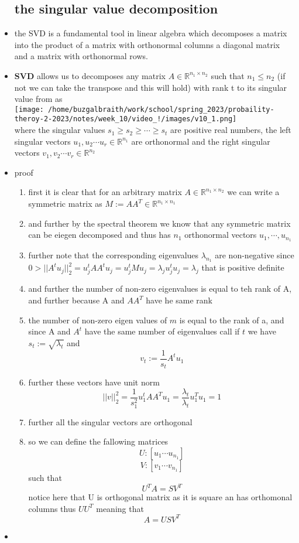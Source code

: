 \documentclass{article}
\begin{document}
\begin{itemize}
\subsection*{the singular value decomposition }
\item the SVD is a fundamental tool in linear algebra which decomposes a matrix into the product of a matrix with orthonormal columns
a diagonal matrix and a matrix with orthonormal rows. 
\item \textbf{SVD} allows us to decomposes any matrix $A\in \mathbb{R}^{n_1\times n_2}$ such that $n_1\leq n_2$ (if not we can 
take the transpose and this will hold) with rank t to its singular value from as \\
\texttt{[image: /home/buzgalbraith/work/school/spring\_2023/probaility-theroy-2-2023/notes/week\_10/video\_!/images/v10\_1.png]}
\\ where  the singular values $s_1\geq s_2 \geq \cdots \geq s_t$ are positive real numbers, the left singular vectors
$u_1,u_2\cdots u_r\in \mathbb{R}^{n_1}$ are orthonormal and the right singular vectors $v_1,v_2\cdots v_r\in \mathbb{R}^{n_2}$

\item proof
\begin{enumerate}
    \item first it is clear that for an arbitrary matrix $A\in \mathbb{R}^{n_1\times n_2}$ we can write a symmetric matrix as $M:=AA^{T}\in \mathbb{R}^{n_1\times n_1}$
    \item and further by the spectral theorem we know that any symmetric matrix can be eiegen decomposed and thus has $n_1$ orthonormal vectors $u_1,\cdots , u_{n_1}$
    \item further note that the corresponding eigenvalues $\lambda_{n_1}$ are non-negative since $0> ||A^{t}u_{j}||_{2}^{2}=u_{j}^{t}AA^{t}u_{j}=u_{j}^{t}Mu_{j}=\lambda_{j}u_{j}^{t}u_{j}=\lambda_{j}$ that is positive definite
    \item and further the number of non-zero eigenvalues is equal to teh rank of A, and further because A and $AA^{T}$ have he same rank  
    \item the  number of non-zero eigen values of $m$ is equal to the rank of a, and since A and $A^{t}$ have the same number of eigenvalues call if $t$ we have $s_{t}:=\sqrt{\lambda_{t}}$ and $$v_{t}:=\frac{1}{s_{t}}A^tu_{1}$$
    \item further these vectors have unit norm $$||v||_{2}^{2}=\frac{1}{s_{1}^2}u_{1}^{t}AA^{T}u_{1}=\frac{\lambda _t}{\lambda_t}u_{1}^{T}u_{1}=1$$
    \item further all the singular vectors are orthogonal
    \item so we can define the fallowing matrices $$U:[u_1\cdots u_{n_1}]$$ $$V:[v_1\cdots v_{n_1}]$$ such that $$U^TA=SV^T$$
    notice here that U is orthogonal  matrix as it is square an has orthomonal columns thus $UU^{T}$ meaning that $$A=USV^T$$
\end{enumerate}
\item 
\end{itemize}
\end{document}
